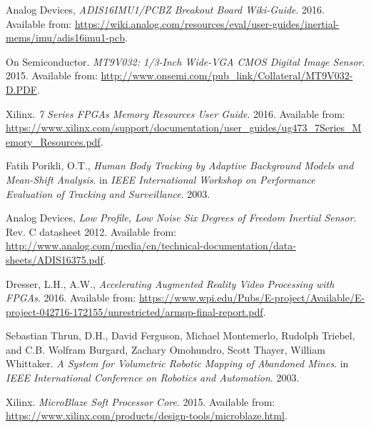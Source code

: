 \begin{thebibliography}{100}
 Analog Devices, \textit{ADIS16IMU1/PCBZ Breakout Board Wiki-Guide}. 2016. Available from: \url{https://wiki.analog.com/resources/eval/user-guides/inertial-mems/imu/adis16imu1-pcb}.

 On Semiconductor. 
\textit{MT9V032: 1/3-Inch Wide-VGA CMOS Digital Image Sensor}. 2015. 
Available from: \url{http://www.onsemi.com/pub_link/Collateral/MT9V032-D.PDF}.

 Xilinx. \textit{7 Series FPGAs Memory Resources User Guide}. 2016. Available from: \url{https://www.xilinx.com/support/documentation/user_guides/ug473_7Series_Memory_Resources.pdf}.

 Fatih Porikli, O.T.,
\textit{Human Body Tracking by Adaptive Background Models and Mean-Shift Analysis}.
in \textit{IEEE International Workshop on Performance Evaluation of Tracking and Surveillance}. 2003.

 Analog Devices, \textit{Low Profile, Low Noise Six Degrees of Freedom Inertial Sensor}. Rev. C datasheet 2012. Available from: \url{http://www.analog.com/media/en/technical-documentation/data-sheets/ADIS16375.pdf}.

 Dresser, L.H., A.W., \textit{Accelerating Augmented Reality Video Processing with FPGAs}. 2016. Available from: \url{https://www.wpi.edu/Pubs/E-project/Available/E-project-042716-172155/unrestricted/armqp-final-report.pdf}.

 Sebastian Thrun, D.H., David Ferguson, Michael Montemerlo, Rudolph Triebel, and C.B. Wolfram Burgard, Zachary Omohundro, Scott Thayer, William Whittaker.
\textit{A System for Volumetric Robotic Mapping of Abandoned Mines}. 
in \textit{IEEE International Conference on Robotics and Automation}. 2003.

 Xilinx. \textit{MicroBlaze Soft Processor Core}. 2015. Available from: \url{https://www.xilinx.com/products/design-tools/microblaze.html}.


\end{thebibliography}
\newpage{\pagestyle{empty}\cleardoublepage}
